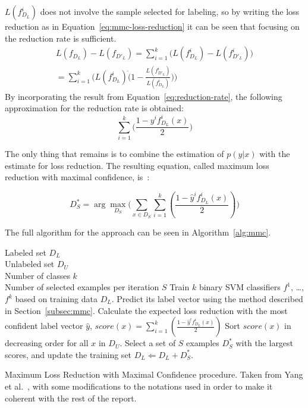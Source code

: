 $L(f^i_{D_L})$ does not involve the sample selected for labeling, so by writing the loss reduction as in Equation~\ref{eq:mmc-loss-reduction} it can be seen that focusing on the reduction rate is sufficient.
\begin{equation}\label{eq:mmc-loss-reduction}
    \begin{split}
        L(f_{D_L}) - L(f_{D'_L}) = \sum_{i=1}^k\big ( L(f^i_{D_L}) - L(f^i_{D'_L}) \big )\\
        = \sum_{i=1}^k\big ( L(f^i_{D_L}) \dot (1 - \frac{L(f^i_{D'_L})}{L(f^i_{D_L})}) \big )
    \end{split}
\end{equation}
By incorporating the result from Equation~\ref{eq:reduction-rate}, the following approximation for the reduction rate is obtained:
\begin{equation}
    \sum_{i=1}^k\big ( \frac{1 - y^if^i_{D_L}(x)}{2} \big )
\end{equation}

The only thing that remains is to combine the estimation of $p(y|x)$ with the estimate for loss reduction.
The resulting equation, called maximum loss reduction with maximal confidence, is~\cite{yang2009effective}:

\begin{equation}
    D^*_S = \arg \max_{D_S} \big ( \sum_{x \in D_S} \sum_{i=1}^k (\frac{1 - \hat{y}^if^i_{D_L}(x)}{2}) \big )
\end{equation}

The full algorithm for the approach can be seen in Algorithm~\ref{alg:mmc}.

\begin{algorithm}
    \begin{algorithmic}
        \REQUIRE Labeled set $D_L$\\
                 Unlabeled set $D_U$ \\
                 Number of classes $k$ \\
                 Number of selected examples per iteration $S$
        \REPEAT
            \STATE Train $k$ binary SVM classifiers $f^1$, \dots, $f^k$ based on training data $D_L$.
                \STATE Predict its label vector using the method described in Section~\ref{subsec:mmc}.
                \STATE Calculate the expected loss reduction with the most confident label vector $\hat{y}$, $score(x) = \sum_{i=1}^k (\frac{1 - \hat{y}^if^i_{D_L}(x)}{2})$
            \ENDFOR
            \STATE Sort $score(x)$ in decreasing order for all $x$ in $D_U$.
            \STATE Select a set of $S$ examples $D_S^*$ with the largest scores, and update the training set $D_L \Leftarrow D_L + D^*_S$.
    \end{algorithmic}

    \caption{Maximum Loss Reduction with Maximal Confidence procedure. Taken from Yang et al\@.~\cite{yang2009effective}, with some modifications to the notations used in order to make it coherent with the rest of the report.}
    \label{alg:mmc}
\end{algorithm}


